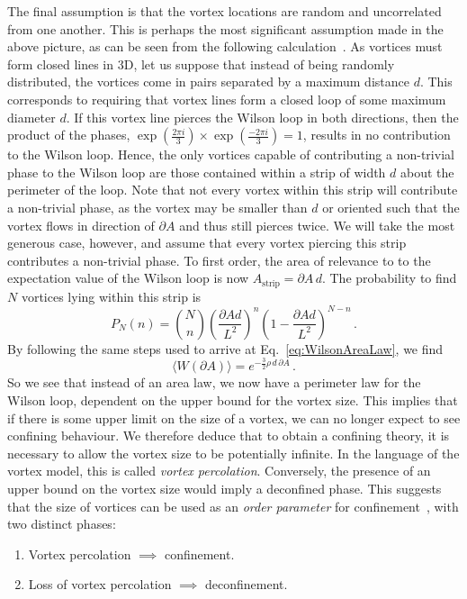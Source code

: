 The final assumption is that the vortex locations are random and uncorrelated from one another. This is perhaps the most significant assumption made in the above picture, as can be seen from the following calculation~\cite{Engelhardt:1999fd}. As vortices must form closed lines in 3D, let us suppose that instead of being randomly distributed, the vortices come in pairs separated by a maximum distance $d$. This corresponds to requiring that vortex lines form a closed loop of some maximum diameter $d$. If this vortex line pierces the Wilson loop in both directions, then the product of the phases, $\exp\left(\frac{2\pi i}{3}\right)\times \exp\left(\frac{-2\pi i}{3}\right) = 1$, results in no contribution to the Wilson loop. Hence, the only vortices capable of contributing a non-trivial phase to the Wilson loop are those contained within a strip of width $d$ about the perimeter of the loop. Note that not every vortex within this strip will contribute a non-trivial phase, as the vortex may be smaller than $d$ or oriented such that the vortex flows in direction of $\partial A$ and thus still pierces twice. We will take the most generous case, however, and assume that every vortex piercing this strip contributes a non-trivial phase. To first order, the area of relevance to to the expectation value of the Wilson loop is now $A_\text{strip}=\partial A\, d$. The probability to find $N$ vortices lying within this strip is 
%
\begin{equation}
P_N(n) = {N\choose n} \left(\frac{\partial A d}{L^2}\right)^n \left(1-\frac{\partial A d}{L^2}\right)^{N-n}\, .
\end{equation}
%
By following the same steps used to arrive at Eq.~\ref{eq:WilsonAreaLaw}, we find
%
\begin{equation}
\langle W(\partial A)\rangle = e^{-\frac{3}{2}\rho\, d\, \partial A}\, .
\end{equation}
%
So we see that instead of an area law, we now have a perimeter law for the Wilson loop, dependent on the upper bound for the vortex size. This implies that if there is some upper limit on the size of a vortex, we can no longer expect to see confining behaviour. We therefore deduce that to obtain a confining theory, it is necessary to allow the vortex size to be potentially infinite. In the language of the vortex model, this is called \textit{vortex percolation}. Conversely, the presence of an upper bound on the vortex size would imply a deconfined phase. This suggests that the size of vortices can be used as an \textit{order parameter} for confinement~\cite{Langfeld:1998cz}, with two distinct phases:
\begin{enumerate}
\item Vortex percolation $\implies$ confinement.
\item Loss of vortex percolation $\implies$ deconfinement.
\end{enumerate}

